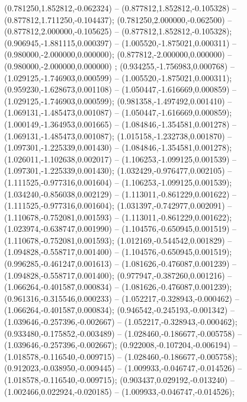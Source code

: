  (0.781250,1.852812,-0.062324) -- (0.877812,1.852812,-0.105328) -- (0.877812,1.711250,-0.104437);
 (0.781250,2.000000,-0.062500) -- (0.877812,2.000000,-0.105625) -- (0.877812,1.852812,-0.105328);
 (0.906945,-1.881115,0.000397) -- (1.005520,-1.875021,0.000311) -- (0.980000,-2.000000,0.000000);
 (0.877812,-2.000000,0.000000) -- (0.980000,-2.000000,0.000000) ;
 (0.934255,-1.756983,0.000768) -- (1.029125,-1.746903,0.000599) -- (1.005520,-1.875021,0.000311);
 (0.959230,-1.628673,0.001108) -- (1.050447,-1.616669,0.000859) -- (1.029125,-1.746903,0.000599);
 (0.981358,-1.497492,0.001410) -- (1.069131,-1.485473,0.001087) -- (1.050447,-1.616669,0.000859);
 (1.000149,-1.364953,0.001665) -- (1.084846,-1.354581,0.001278) -- (1.069131,-1.485473,0.001087);
 (1.015158,-1.232738,0.001870) -- (1.097301,-1.225339,0.001430) -- (1.084846,-1.354581,0.001278);
 (1.026011,-1.102638,0.002017) -- (1.106253,-1.099125,0.001539) -- (1.097301,-1.225339,0.001430);
 (1.032429,-0.976477,0.002105) -- (1.111525,-0.977316,0.001604) -- (1.106253,-1.099125,0.001539);
 (1.034240,-0.856038,0.002129) -- (1.113011,-0.861229,0.001622) -- (1.111525,-0.977316,0.001604);
 (1.031397,-0.742977,0.002091) -- (1.110678,-0.752081,0.001593) -- (1.113011,-0.861229,0.001622);
 (1.023974,-0.638747,0.001990) -- (1.104576,-0.650945,0.001519) -- (1.110678,-0.752081,0.001593);
 (1.012169,-0.544542,0.001829) -- (1.094828,-0.558717,0.001400) -- (1.104576,-0.650945,0.001519);
 (0.996285,-0.461247,0.001613) -- (1.081626,-0.476087,0.001239) -- (1.094828,-0.558717,0.001400);
 (0.977947,-0.387260,0.001216) -- (1.066264,-0.401587,0.000834) -- (1.081626,-0.476087,0.001239);
 (0.961316,-0.315546,0.000233) -- (1.052217,-0.328943,-0.000462) -- (1.066264,-0.401587,0.000834);
 (0.946542,-0.245193,-0.001342) -- (1.039646,-0.257396,-0.002667) -- (1.052217,-0.328943,-0.000462);
 (0.933480,-0.175852,-0.003489) -- (1.028460,-0.186677,-0.005758) -- (1.039646,-0.257396,-0.002667);
 (0.922008,-0.107204,-0.006194) -- (1.018578,-0.116540,-0.009715) -- (1.028460,-0.186677,-0.005758);
 (0.912023,-0.038950,-0.009445) -- (1.009933,-0.046747,-0.014526) -- (1.018578,-0.116540,-0.009715);
 (0.903437,0.029192,-0.013240) -- (1.002466,0.022924,-0.020185) -- (1.009933,-0.046747,-0.014526);

